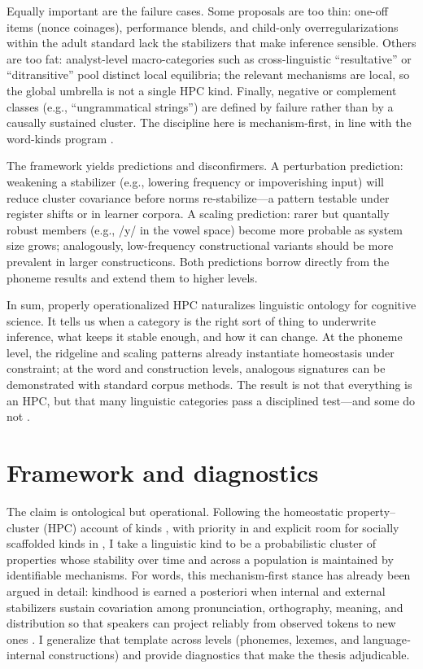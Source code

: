 \documentclass[12pt]{article}
\begin{document}
Equally important are the failure cases. Some proposals are too thin: one-off items (nonce coinages), performance blends, and child-only overregularizations within the adult standard lack the stabilizers that make inference sensible. Others are too fat: analyst-level macro-categories such as cross-linguistic ``resultative'' or ``ditransitive'' pool distinct local equilibria; the relevant mechanisms are local, so the global umbrella is not a single HPC kind. Finally, negative or complement classes (e.g., ``ungrammatical strings'') are defined by failure rather than by a causally sustained cluster. The discipline here is mechanism-first, in line with the word-kinds program \citep{Miller2021WordsSpeciesKinds}.

The framework yields predictions and disconfirmers. A perturbation prediction: weakening a stabilizer (e.g., lowering frequency or impoverishing input) will reduce cluster covariance before norms re-stabilize---a pattern testable under register shifts or in learner corpora. A scaling prediction: rarer but quantally robust members (e.g., /y/ in the vowel space) become more probable as system size grows; analogously, low-frequency constructional variants should be more prevalent in larger constructicons. Both predictions borrow directly from the phoneme results \citep[Fig.\,2 p.\,7]{Ekstrom2025PhonemeTool} and extend them to higher levels.

In sum, properly operationalized HPC naturalizes linguistic ontology for cognitive science. It tells us when a category is the right sort of thing to underwrite inference, what keeps it stable enough, and how it can change. At the phoneme level, the ridgeline and scaling patterns already instantiate homeostasis under constraint; at the word and construction levels, analogous signatures can be demonstrated with standard corpus methods. The result is not that everything is an HPC, but that many linguistic categories pass a disciplined test---and some do not \citep{Miller2021WordsSpeciesKinds,Ekstrom2025PhonemeTool}.

\section{Framework and diagnostics}\label{sec:framework}

The claim is ontological but operational. Following the homeostatic property–cluster (HPC) account of kinds \citep{Boyd1991Enthusiasm,Boyd1999Homeostasis}, with priority in \citet[§3.8]{Boyd1988MoralRealist} and explicit room for socially scaffolded kinds in \citet{Boyd2000Workmanship}, I take a linguistic kind to be a probabilistic cluster of properties whose stability over time and across a population is maintained by identifiable mechanisms. For words, this mechanism‐first stance has already been argued in detail: kindhood is earned a posteriori when internal and external stabilizers sustain covariation among pronunciation, orthography, meaning, and distribution so that speakers can project reliably from observed tokens to new ones \citep{Miller2021WordsSpeciesKinds}. I generalize that template across levels (phonemes, lexemes, and language‐internal constructions) and provide diagnostics that make the thesis adjudicable.
\end{document}
